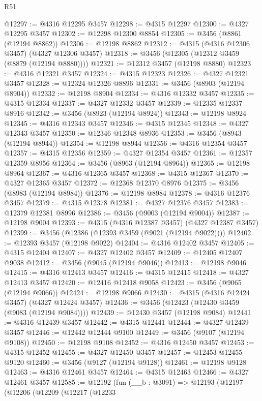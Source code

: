 \begin{lexlean}{R51}
\begin{coremodule}
@12297 := @4316 @12295 @3457
@12298 := @4315 @12297
@12300 := @4327 @12295 @3457
@12302 := @12298 @12300 @8854
@12305 := @3456 (@8861 (@12194 @8862))
@12306 := @12198 @8862
@12312 := @4315 (@4316 @12306 @3457) (@4327 @12306 @3457)
@12318 := @3456 (@12305 (@12312 @3459 (@8879 (@12194 @8880))))
@12321 := @12312 @3457 (@12198 @8880)
@12323 := @4316 @12321 @3457
@12324 := @4315 @12323
@12326 := @4327 @12321 @3457
@12328 := @12324 @12326 @8896
@12331 := @3456 (@8903 (@12194 @8904))
@12332 := @12198 @8904
@12334 := @4316 @12332 @3457
@12335 := @4315 @12334
@12337 := @4327 @12332 @3457
@12339 := @12335 @12337 @8916
@12342 := @3456 (@8923 (@12194 @8924))
@12343 := @12198 @8924
@12345 := @4316 @12343 @3457
@12346 := @4315 @12345
@12348 := @4327 @12343 @3457
@12350 := @12346 @12348 @8936
@12353 := @3456 (@8943 (@12194 @8944))
@12354 := @12198 @8944
@12356 := @4316 @12354 @3457
@12357 := @4315 @12356
@12359 := @4327 @12354 @3457
@12361 := @12357 @12359 @8956
@12364 := @3456 (@8963 (@12194 @8964))
@12365 := @12198 @8964
@12367 := @4316 @12365 @3457
@12368 := @4315 @12367
@12370 := @4327 @12365 @3457
@12372 := @12368 @12370 @8976
@12375 := @3456 (@8983 (@12194 @8984))
@12376 := @12198 @8984
@12378 := @4316 @12376 @3457
@12379 := @4315 @12378
@12381 := @4327 @12376 @3457
@12383 := @12379 @12381 @8996
@12386 := @3456 (@9003 (@12194 @9004))
@12387 := @12198 @9004
@12393 := @4315 (@4316 @12387 @3457) (@4327 @12387 @3457)
@12399 := @3456 (@12386 (@12393 @3459 (@9021 (@12194 @9022))))
@12402 := @12393 @3457 (@12198 @9022)
@12404 := @4316 @12402 @3457
@12405 := @4315 @12404
@12407 := @4327 @12402 @3457
@12409 := @12405 @12407 @9038
@12412 := @3456 (@9045 (@12194 @9046))
@12413 := @12198 @9046
@12415 := @4316 @12413 @3457
@12416 := @4315 @12415
@12418 := @4327 @12413 @3457
@12420 := @12416 @12418 @9058
@12423 := @3456 (@9065 (@12194 @9066))
@12424 := @12198 @9066
@12430 := @4315 (@4316 @12424 @3457) (@4327 @12424 @3457)
@12436 := @3456 (@12423 (@12430 @3459 (@9083 (@12194 @9084))))
@12439 := @12430 @3457 (@12198 @9084)
@12441 := @4316 @12439 @3457
@12442 := @4315 @12441
@12444 := @4327 @12439 @3457
@12446 := @12442 @12444 @9100
@12449 := @3456 (@9107 (@12194 @9108))
@12450 := @12198 @9108
@12452 := @4316 @12450 @3457
@12453 := @4315 @12452
@12455 := @4327 @12450 @3457
@12457 := @12453 @12455 @9120
@12460 := @3456 (@9127 (@12194 @9128))
@12461 := @12198 @9128
@12463 := @4316 @12461 @3457
@12464 := @4315 @12463
@12466 := @4327 @12461 @3457
@12585 := @12192
    (fun (__b : @3091) =>
    @12193
      (@12197
        (@12206
          (@12209
            (@12217
              (@12233

\end{coremodule}
\end{lexlean}
